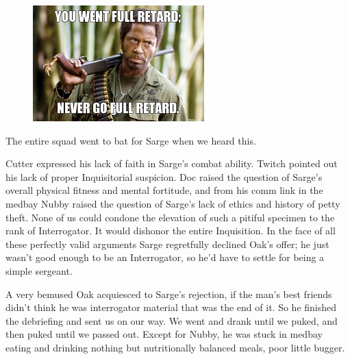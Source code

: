 \begin{figure}
	\begin{center}
		\includegraphics[width=\figwidth]{pics/5/43.png}
	\end{center}
\end{figure}
The entire squad went to bat for Sarge when we heard this.

Cutter expressed his lack of faith in Sarge’s combat ability. Twitch pointed out his lack of proper Inquisitorial suspicion. 
Doc raised the question of Sarge’s overall physical fitness and mental fortitude, and from his comm link in the medbay Nubby raised the question of Sarge’s lack of ethics and history of petty theft. 
None of us could condone the elevation of such a pitiful specimen to the rank of Interrogator. 
It would dishonor the entire Inquisition. In the face of all these perfectly valid arguments Sarge regretfully declined Oak’s offer; 
he just wasn’t good enough to be an Interrogator, so he’d have to settle for being a simple sergeant.

A very bemused Oak acquiesced to Sarge’s rejection, if the man’s best friends didn’t think he was interrogator material that was the end of it. 
So he finished the debriefing and sent us on our way.
We went and drank until we puked, and then puked until we passed out.
Except for Nubby, he was stuck in medbay eating and drinking nothing but nutritionally balanced meals, poor little bugger.


